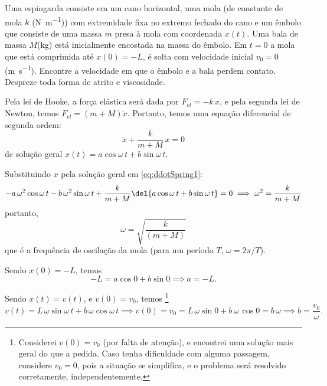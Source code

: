 \documentclass[]{IMTexam}
\author{Isabella B.}
\date{}
\begin{document}
\maketitle

\begin{questions}

	\question \label{ques:q1} Uma espingarda consiste em um cano horizontal, uma mola (de constante de mola $ k $ (\si{\newton\per\meter})) com extremidade fixa no extremo fechado do cano e um êmbolo que consiste de uma massa $ m $ presa à mola com coordenada $ x(t) $. Uma bala de massa $ M $(\si{\kilogram}) está inicialmente encostada na massa do êmbolo. Em $ t = 0 $ a mola que está comprimida até $ x(0) = −L $, é solta com velocidade inicial $ v_0 = 0 $ (\si{\meter\per\second}). Encontre a velocidade em que o êmbolo e a bala perdem contato. Despreze toda forma de atrito e viscosidade.

	\begin{solution}
		Pela lei de Hooke, a força elástica será dada por $ F_{el}=-k\,x $, e pela segunda lei de Newton, temos $ F_{el}=(m+M)\ddot{x} $. Portanto, temos uma equação diferencial de segunda ordem:
		\begin{equation}\label{eq:ddotSpring1}
			\ddot{x}+\dfrac{k}{m+M}\,x=0
		\end{equation}
		de solução geral $ x(t)=a\cos\omega\,t+b\sin\omega\,t $.

		Substituindo $ x $ pela solução geral em \ref{eq:ddotSpring1}:
		\[ -a\,\omega^{2}\cos\omega\,t-b\,\omega^{2}\sin\omega\,t+\dfrac{k}{m+M}\del{a\cos\omega\,t+b\sin\omega\,t}=0\implies \omega^{2}=\dfrac{k}{m+M} \]
		portanto,
		\begin{equation}\label{eq:omegaSpring}
			\omega=\sqrt{\dfrac{k}{(m+M)}}
		\end{equation}
		que é a frequência de oscilação da mola (para um período $ T $, $ \omega=2\pi/T $).

		Sendo $ x(0)=-L $, temos
		\[ -L=a\cos0+b\sin0\implies a=-L. \]

		Sendo $ \dot{x}(t)=v(t) $, e $ v(0)=v_0 $, temos%
		\footnote{Considerei $ v(0)=v_0 $ (por falta de atenção), e encontrei uma solução mais geral do que a pedida. Caso tenha dificuldade com alguma passagem, considere $ v_0=0 $, pois a situação se simplifica, e o problema será resolvido corretamente, independentemente.}%
		\[ v(t)=L\,\omega\sin\omega\,t+b\,\omega\cos\omega\,t\implies v(0)=v_0=L\,\omega\sin0+b\,\omega\,\cos0=b\,\omega\implies b=\dfrac{v_0}{\omega}. \]


\end{solution}
\end{questions}
\end{document}
